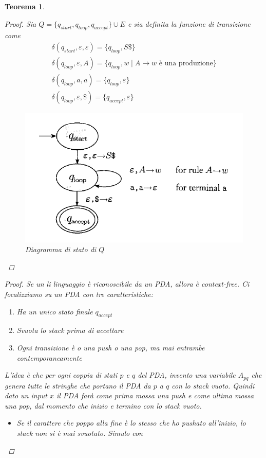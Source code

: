 \documentclass[italian]{article}
\newcommand{\taleche}{\;|\;}
\newtheorem*{theorem*}{Teorema}
\begin{document}
\begin{theorem*}
\begin{proof}
	\noindent
	Sia $Q = \{q_{start},q_{loop},q_{accept}\} \cup E$ e sia definita la funzione di transizione come
	\begin{gather*}
		\delta(q_{start},\varepsilon,\varepsilon) = \{ q_{loop}, S\$ \} \\
		\delta(q_{loop},\varepsilon,A) = \{ q_{loop}, w \taleche A \to w \text{ è una produzione} \} \\
		\delta(q_{loop},a,a) = \{ q_{loop}, \varepsilon \} \\
		\delta(q_{loop},\varepsilon,\$) = \{ q_{accept}, \varepsilon \} 
	\end{gather*}
	\begin{center}
		\begin{figure}[h]
			\centering
			\includegraphics[width=0.5\linewidth]{images/pda-delta}
			\caption[Diagramma di stato di $Q$]{Diagramma di stato di $Q$}
			\label{fig:pda-delta}
		\end{figure}
	\end{center}
	\end{proof}
	\begin{proof}
		Se un li linguaggio è riconoscibile da un PDA, allora è \textit{context-free}. Ci focalizziamo su un PDA con tre caratteristiche:
		\begin{enumerate}
			\item Ha un unico stato finale $q_{accept}$
			\item Svuota lo stack prima di accettare
			\item Ogni transizione è o una push o una pop, ma mai entrambe contemporaneamente
		\end{enumerate} 
		L'idea è che per ogni coppia di stati $p$ e $q$ del PDA, invento una variabile $A_{pq}$ che genera tutte le stringhe che portano il PDA da $p$ a $q$ con lo stack vuoto. Quindi dato un input $x$ il PDA farà come prima mossa una push e come ultima mossa una pop, dal momento che inizio e termino con lo stack vuoto.
		\begin{itemize}
			\item Se il carattere che poppo alla fine è lo stesso che ho pushato all'inizio, lo stack non si è mai svuotato. Simulo con 

\end{itemize}
\end{proof}
\end{theorem*}
\end{document}
